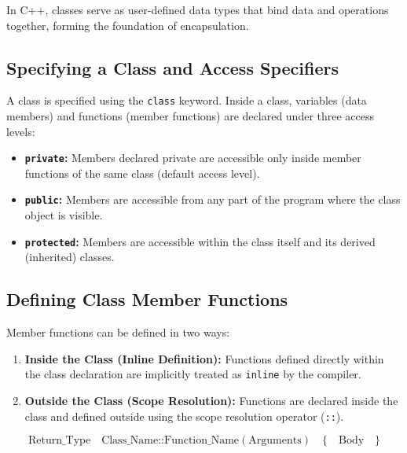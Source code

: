 \documentclass[12pt,a4paper]{article}
\begin{document}
In C++, classes serve as user-defined data types that bind data and operations together, forming the foundation of encapsulation.

\subsection{Specifying a Class and Access Specifiers}
A class is specified using the \texttt{class} keyword. Inside a class, variables (data members) and functions (member functions) are declared under three access levels:
\begin{itemize}[leftmargin=*, itemsep=3pt]
  \item \textbf{\texttt{private}:} Members declared private are accessible only inside member functions of the same class (default access level).
  \item \textbf{\texttt{public}:} Members are accessible from any part of the program where the class object is visible.
  \item \textbf{\texttt{protected}:} Members are accessible within the class itself and its derived (inherited) classes.
\end{itemize}

\subsection{Defining Class Member Functions}
Member functions can be defined in two ways:
\begin{enumerate}[label=\textbf{\arabic*.}, leftmargin=*, itemsep=4pt]
  \item \textbf{Inside the Class (Inline Definition):} Functions defined directly within the class declaration are implicitly treated as \texttt{inline} by the compiler.
  \item \textbf{Outside the Class (Scope Resolution):} Functions are declared inside the class and defined outside using the scope resolution operator (\texttt{::}).
\end{enumerate}

\begin{tcolorbox}[defbox, title={\textbf{Member Function Syntax Outside Class}}]
\begin{equation}
  \text{Return\_Type} \quad \text{Class\_Name}\texttt{::}\text{Function\_Name}(\text{Arguments}) \quad \{ \quad \text{Body} \quad \}
\end{equation}
\end{tcolorbox}
\end{document}

